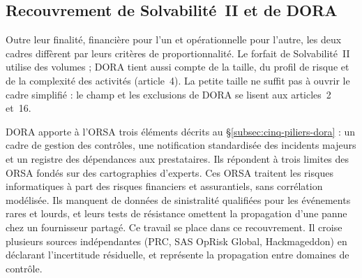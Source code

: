 \subsection{Recouvrement de Solvabilité~II et de DORA}
\label{subsec:orsa-dora-detail}

Outre leur finalité, financière pour l'un et opérationnelle pour l'autre, les deux cadres diffèrent
par leurs critères de proportionnalité. Le forfait de Solvabilité~II utilise des volumes ; DORA tient
aussi compte de la taille, du profil de risque et de la complexité des activités (article~4). La petite taille ne suffit pas à ouvrir le cadre simplifié : le champ et les exclusions de DORA se lisent aux articles~2 et~16.

DORA apporte à l'ORSA trois éléments décrits au \S\ref{subsec:cinq-piliers-dora} : un cadre de
gestion des contrôles, une notification standardisée des incidents majeurs et un
registre des dépendances aux prestataires. Ils répondent à trois limites des ORSA fondés sur des
cartographies d'experts. Ces ORSA traitent les risques informatiques à part des risques financiers et
assurantiels, sans corrélation modélisée. Ils manquent de données de sinistralité qualifiées pour les
événements rares et lourds, et leurs tests de résistance omettent la propagation d'une panne
chez un fournisseur partagé. Ce travail se place dans ce recouvrement. Il croise plusieurs sources
indépendantes (PRC, SAS OpRisk Global, Hackmageddon) en déclarant l'incertitude résiduelle, et
représente la propagation entre domaines de contrôle.
